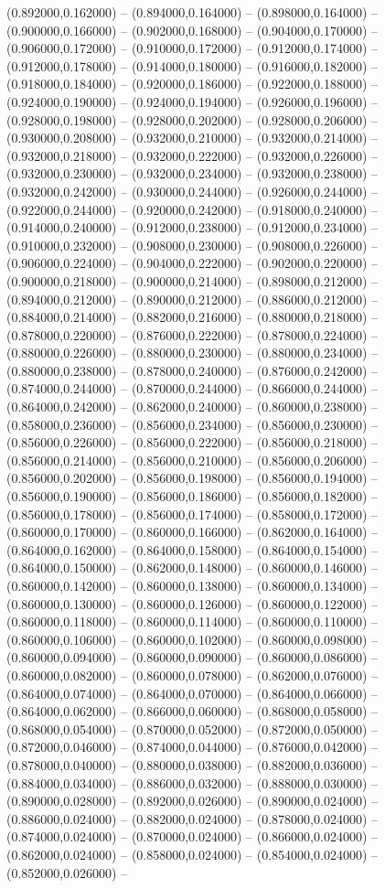 (0.892000,0.162000) -- (0.894000,0.164000) -- (0.898000,0.164000) -- (0.900000,0.166000) -- (0.902000,0.168000) -- (0.904000,0.170000) -- (0.906000,0.172000) -- (0.910000,0.172000) -- (0.912000,0.174000) -- (0.912000,0.178000) -- (0.914000,0.180000) -- (0.916000,0.182000) -- (0.918000,0.184000) -- (0.920000,0.186000) -- (0.922000,0.188000) -- (0.924000,0.190000) -- (0.924000,0.194000) -- (0.926000,0.196000) -- (0.928000,0.198000) -- (0.928000,0.202000) -- (0.928000,0.206000) -- (0.930000,0.208000) -- (0.932000,0.210000) -- (0.932000,0.214000) -- (0.932000,0.218000) -- (0.932000,0.222000) -- (0.932000,0.226000) -- (0.932000,0.230000) -- (0.932000,0.234000) -- (0.932000,0.238000) -- (0.932000,0.242000) -- (0.930000,0.244000) -- (0.926000,0.244000) -- (0.922000,0.244000) -- (0.920000,0.242000) -- (0.918000,0.240000) -- (0.914000,0.240000) -- (0.912000,0.238000) -- (0.912000,0.234000) -- (0.910000,0.232000) -- (0.908000,0.230000) -- (0.908000,0.226000) -- (0.906000,0.224000) -- (0.904000,0.222000) -- (0.902000,0.220000) -- (0.900000,0.218000) -- (0.900000,0.214000) -- (0.898000,0.212000) -- (0.894000,0.212000) -- (0.890000,0.212000) -- (0.886000,0.212000) -- (0.884000,0.214000) -- (0.882000,0.216000) -- (0.880000,0.218000) -- (0.878000,0.220000) -- (0.876000,0.222000) -- (0.878000,0.224000) -- (0.880000,0.226000) -- (0.880000,0.230000) -- (0.880000,0.234000) -- (0.880000,0.238000) -- (0.878000,0.240000) -- (0.876000,0.242000) -- (0.874000,0.244000) -- (0.870000,0.244000) -- (0.866000,0.244000) -- (0.864000,0.242000) -- (0.862000,0.240000) -- (0.860000,0.238000) -- (0.858000,0.236000) -- (0.856000,0.234000) -- (0.856000,0.230000) -- (0.856000,0.226000) -- (0.856000,0.222000) -- (0.856000,0.218000) -- (0.856000,0.214000) -- (0.856000,0.210000) -- (0.856000,0.206000) -- (0.856000,0.202000) -- (0.856000,0.198000) -- (0.856000,0.194000) -- (0.856000,0.190000) -- (0.856000,0.186000) -- (0.856000,0.182000) -- (0.856000,0.178000) -- (0.856000,0.174000) -- (0.858000,0.172000) -- (0.860000,0.170000) -- (0.860000,0.166000) -- (0.862000,0.164000) -- (0.864000,0.162000) -- (0.864000,0.158000) -- (0.864000,0.154000) -- (0.864000,0.150000) -- (0.862000,0.148000) -- (0.860000,0.146000) -- (0.860000,0.142000) -- (0.860000,0.138000) -- (0.860000,0.134000) -- (0.860000,0.130000) -- (0.860000,0.126000) -- (0.860000,0.122000) -- (0.860000,0.118000) -- (0.860000,0.114000) -- (0.860000,0.110000) -- (0.860000,0.106000) -- (0.860000,0.102000) -- (0.860000,0.098000) -- (0.860000,0.094000) -- (0.860000,0.090000) -- (0.860000,0.086000) -- (0.860000,0.082000) -- (0.860000,0.078000) -- (0.862000,0.076000) -- (0.864000,0.074000) -- (0.864000,0.070000) -- (0.864000,0.066000) -- (0.864000,0.062000) -- (0.866000,0.060000) -- (0.868000,0.058000) -- (0.868000,0.054000) -- (0.870000,0.052000) -- (0.872000,0.050000) -- (0.872000,0.046000) -- (0.874000,0.044000) -- (0.876000,0.042000) -- (0.878000,0.040000) -- (0.880000,0.038000) -- (0.882000,0.036000) -- (0.884000,0.034000) -- (0.886000,0.032000) -- (0.888000,0.030000) -- (0.890000,0.028000) -- (0.892000,0.026000) -- (0.890000,0.024000) -- (0.886000,0.024000) -- (0.882000,0.024000) -- (0.878000,0.024000) -- (0.874000,0.024000) -- (0.870000,0.024000) -- (0.866000,0.024000) -- (0.862000,0.024000) -- (0.858000,0.024000) -- (0.854000,0.024000) -- (0.852000,0.026000) -- 